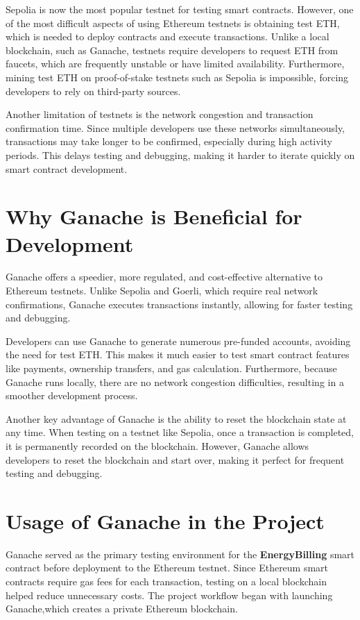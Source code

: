 \documentclass[a4paper,12pt]{report}
\begin{document}
 Sepolia is now the most popular testnet for testing smart contracts.  However, one of the most difficult aspects of using Ethereum testnets is obtaining test ETH, which is needed to deploy contracts and execute transactions.  Unlike a local blockchain, such as Ganache, testnets require developers to request ETH from faucets, which are frequently unstable or have limited availability.  Furthermore, mining test ETH on proof-of-stake testnets such as Sepolia is impossible, forcing developers to rely on third-party sources.


Another limitation of testnets is the network congestion and transaction confirmation time. Since multiple developers use these networks simultaneously, transactions may take longer to be confirmed, especially during high activity periods. This delays testing and debugging, making it harder to iterate quickly on smart contract development.

\section{Why Ganache is Beneficial for Development}
Ganache offers a speedier, more regulated, and cost-effective alternative to Ethereum testnets.  Unlike Sepolia and Goerli, which require real network confirmations, Ganache executes transactions instantly, allowing for faster testing and debugging.


Developers can use Ganache to generate numerous pre-funded accounts, avoiding the need for test ETH. This makes it much easier to test smart contract features like payments, ownership transfers, and gas calculation.  Furthermore, because Ganache runs locally, there are no network congestion difficulties, resulting in a smoother development process.


Another key advantage of Ganache is the ability to reset the blockchain state at any time.  When testing on a testnet like Sepolia, once a transaction is completed, it is permanently recorded on the blockchain.  However, Ganache allows developers to reset the blockchain and start over, making it perfect for frequent testing and debugging.


\section{Usage of Ganache in the Project}
Ganache served as the primary testing environment for the \textbf{EnergyBilling} smart contract before deployment to the Ethereum testnet. Since Ethereum smart contracts require gas fees for each transaction, testing on a local blockchain helped reduce unnecessary costs. The project workflow began with launching Ganache,which creates a private Ethereum blockchain. 
\end{document}
